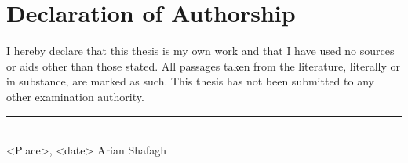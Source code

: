\chapter*{Declaration of Authorship}

I hereby declare that this thesis is my own work and that I have used no sources or aids other
than those stated. All passages taken from the literature, literally or in substance, are marked
as such. This thesis has not been submitted to any other examination authority.


\vspace{2cm}
\noindent\rule{6cm}{0.4pt}\\
<Place>, <date> \hfill Arian Shafagh
